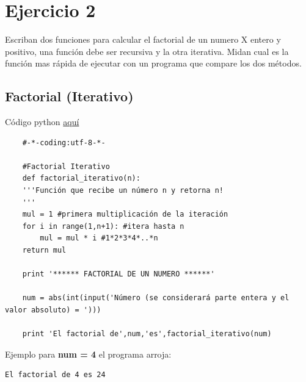 \documentclass{article}
\begin{document}

\section{Ejercicio 2}
Escriban dos funciones para calcular el factorial de un numero X entero y positivo, una función debe ser recursiva y la otra iterativa. Midan cual es la función mas rápida de ejecutar con un programa que compare los dos métodos.

\subsection{Factorial (Iterativo)}
Código python \href{https://github.com/joescalona/Programacion-Astronomica/blob/master/Tarea\%205/problema2_iteracion.py}{aquí}
    \begin{verbatim}
    #-*-coding:utf-8-*-

    #Factorial Iterativo
    def factorial_iterativo(n):
    '''Función que recibe un número n y retorna n!
    '''
    mul = 1 #primera multiplicación de la iteración
    for i in range(1,n+1): #itera hasta n
        mul = mul * i #1*2*3*4*..*n
    return mul

    print '****** FACTORIAL DE UN NUMERO ******'
    
    num = abs(int(input('Número (se considerará parte entera y el valor absoluto) = ')))
    
    print 'El factorial de',num,'es',factorial_iterativo(num)
    \end{verbatim}
    
    \noindent
    Ejemplo para \textbf{num = 4} el programa arroja:
    \begin{lstlisting}[style=C,numbers=none]
    El factorial de 4 es 24
    \end{lstlisting}
\end{document}
